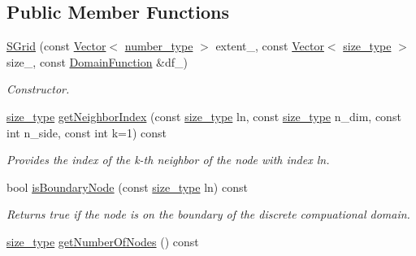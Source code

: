 \subsection*{Public Member Functions}
\begin{DoxyCompactItemize}
\item 
\hyperlink{classhdnum_1_1SGrid_ada654dda6b112ebe8c29fef72f917b7b}{SGrid} (const \hyperlink{classhdnum_1_1Vector}{Vector}$<$ \hyperlink{classhdnum_1_1SGrid_ab27de1dac2771512d96a858153db82f5}{number\_\-type} $>$ extent\_\-, const \hyperlink{classhdnum_1_1Vector}{Vector}$<$ \hyperlink{classhdnum_1_1SGrid_aba7c973b280ecd56f211ac4b8d746280}{size\_\-type} $>$ size\_\-, const \hyperlink{classhdnum_1_1SGrid_a0442a89c48bb466449cb1a7e5d4cc5f6}{DomainFunction} \&df\_\-)
\begin{DoxyCompactList}\small\item\em Constructor. \item\end{DoxyCompactList}\item 
\hyperlink{classhdnum_1_1SGrid_aba7c973b280ecd56f211ac4b8d746280}{size\_\-type} \hyperlink{classhdnum_1_1SGrid_a64eff228d60e47b1ecceaf331ba54173}{getNeighborIndex} (const \hyperlink{classhdnum_1_1SGrid_aba7c973b280ecd56f211ac4b8d746280}{size\_\-type} ln, const \hyperlink{classhdnum_1_1SGrid_aba7c973b280ecd56f211ac4b8d746280}{size\_\-type} n\_\-dim, const int n\_\-side, const int k=1) const 
\begin{DoxyCompactList}\small\item\em Provides the index of the k-\/th neighbor of the node with index ln. \item\end{DoxyCompactList}\item 
\hypertarget{classhdnum_1_1SGrid_a47cc9aa07b061592f69480c0d128e70c}{
bool \hyperlink{classhdnum_1_1SGrid_a47cc9aa07b061592f69480c0d128e70c}{isBoundaryNode} (const \hyperlink{classhdnum_1_1SGrid_aba7c973b280ecd56f211ac4b8d746280}{size\_\-type} ln) const }
\label{classhdnum_1_1SGrid_a47cc9aa07b061592f69480c0d128e70c}

\begin{DoxyCompactList}\small\item\em Returns true if the node is on the boundary of the discrete compuational domain. \item\end{DoxyCompactList}\item 
\hypertarget{classhdnum_1_1SGrid_a60ed482ea236e8fe974401e637efd526}{
\hyperlink{classhdnum_1_1SGrid_aba7c973b280ecd56f211ac4b8d746280}{size\_\-type} \hyperlink{classhdnum_1_1SGrid_a60ed482ea236e8fe974401e637efd526}{getNumberOfNodes} () const }
\label{classhdnum_1_1SGrid_a60ed482ea236e8fe974401e637efd526}


\end{DoxyCompactItemize}
